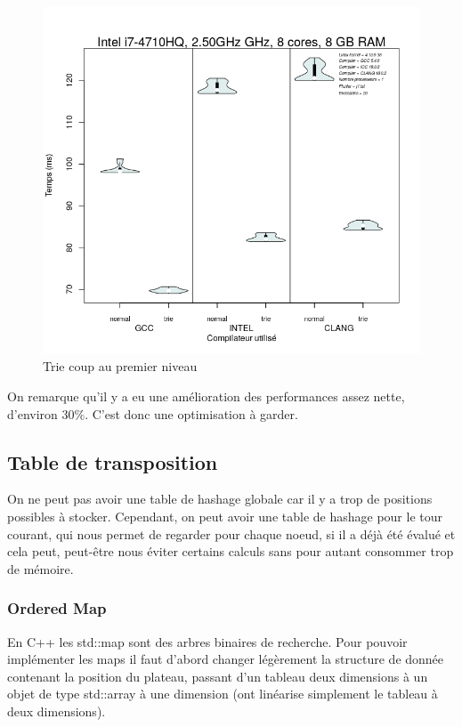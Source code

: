 \documentclass[
 aip,
 jmp,
 amsmath,amssymb,
 reprint
]{revtex4-1}
\begin{document}
\begin{figure}[H]
  \includegraphics[width=\linewidth, keepaspectratio=true]{trie_coup.png}
  \caption{Trie coup au premier niveau\label{Fig:trie_coup}}
\end{figure}

On remarque qu'il y a eu une amélioration des performances assez nette, d'environ 30\%. C'est donc une optimisation à garder.

\subsection{Table de transposition}
On ne peut pas avoir une table de hashage globale car il y a trop de positions possibles à stocker. Cependant, on peut avoir une table de hashage pour le tour courant, qui nous permet de regarder pour chaque noeud, si il a déjà été évalué et cela peut, peut-être nous éviter certains calculs sans pour autant consommer trop de mémoire.

\subsubsection{Ordered Map}
En C++ les std::map sont des arbres binaires de recherche. Pour pouvoir implémenter les maps il faut d'abord changer légèrement la structure de donnée contenant la position du plateau, passant d'un tableau deux dimensions à un objet de type std::array à une dimension (ont linéarise simplement le tableau à deux dimensions).
\end{document}
